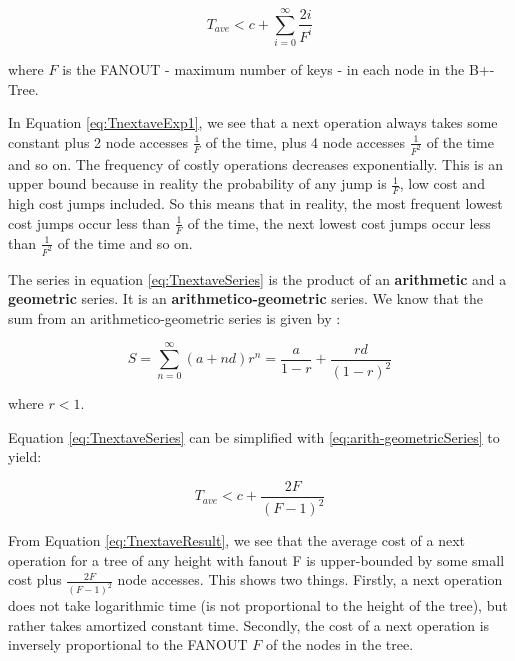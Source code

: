 \begin{equation} \label{eq:TnextaveSeries}
    T_{ave} < c + \sum_{i=0}^{\infty} \frac{2i}{F^i} 
\end{equation}

where $F$ is the FANOUT - maximum number of keys - in each node in the B+-Tree.


In Equation \ref{eq:TnextaveExp1}, we see that a next operation always takes some constant plus 2 node accesses $\frac{1}{F}$ of the time, plus 4 node accesses $\frac{1}{F^2}$ of the time and so on. The frequency of costly operations decreases exponentially. This is an upper bound because in reality the probability of any jump is $\frac{1}{F}$, low cost and high cost jumps included. So this means that in reality, the most frequent lowest cost jumps occur less than $\frac{1}{F}$ of the time, the next lowest cost jumps occur less than $\frac{1}{F^2}$ of the time and so on. 

The series in equation \ref{eq:TnextaveSeries} is the product of an \textbf{arithmetic} and a \textbf{geometric} series. It is an \textbf{arithmetico-geometric} series. We know that the sum from an arithmetico-geometric series is given by \cite{riley2011foundationmaths}:

\begin{equation} \label{eq:arith-geometricSeries}
    S = \sum_{n=0}^{\infty} (a + n d)r^n = \frac{a}{1-r} + \frac{rd}{(1-r)^2} 
\end{equation}


where $r < 1$.

Equation \ref{eq:TnextaveSeries} can be simplified with \ref{eq:arith-geometricSeries} to yield:

\begin{equation} \label{eq:TnextaveResult}
    T_{ave} < c + \frac{2F}{(F-1)^2} 
\end{equation}


From Equation \ref{eq:TnextaveResult}, we see that the average cost of a next operation for a tree of any height with fanout F is upper-bounded by some small cost plus $\frac{2F}{(F-1)^2}$ node accesses. This shows two things. Firstly, a next operation does not take logarithmic time (is not proportional to the height of the tree), but rather takes amortized constant time. Secondly, the cost of a next operation is inversely proportional to the FANOUT $F$ of the nodes in the tree.

